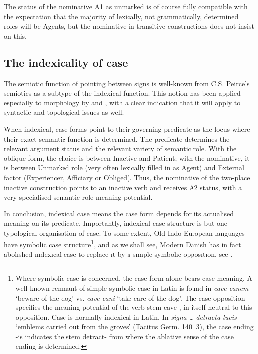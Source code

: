 \documentclass[output=paper]{langscibook}
\begin{document}
The status of the nominative A1 as unmarked is of course fully compatible with the expectation that the majority of lexically, not grammatically, determined roles will be Agents, but the nominative in transitive constructions does not insist on this. 

\subsection{The indexicality of case} \label{heltoft:3.1}

The semiotic function of pointing between signs is well-known from C.S. Peirce's semiotics as a subtype of the indexical function. This notion has been applied especially to morphology by \citet{Andersen1980} and \citet{Antilla1975}, with a clear indication that it will apply to syntactic and topological issues as well. 

When indexical, case forms point to their governing predicate as the locus where their exact semantic function is determined. The predicate determines the relevant argument status and the relevant variety of semantic role. With the oblique form, the choice is between Inactive and Patient; with the nominative, it is between Unmarked role (very often lexically filled in as Agent) and External factor (Experiencer, Afficiary or Obliged). Thus, the nominative of the two-place inactive construction points to an inactive verb and receives A2 status, with a very specialised semantic role meaning potential.  

In conclusion, indexical case means the case form depends for its actualised meaning on its predicate. Importantly, indexical case structure is but one typological organisation of case. To some extent, Old Indo-European languages have symbolic case structure\footnote{Where symbolic case is concerned, the case form alone bears case meaning. A well-known remnant of simple symbolic case in Latin is found in \textit{cave canem} ‘beware of the dog' vs. \textit{cave cani} ‘take care of the dog'. The case opposition specifies the meaning potential of the verb stem cave-, in itself neutral to this opposition. Case is normally indexical in Latin. In \textit{signa … detracta lucis} ‘emblems carried out from the groves' (Tacitus Germ. 140, 3), the case ending -is indicates the stem detract- from where the ablative sense of the case ending is determined.}, and as we shall see, Modern Danish has in fact abolished indexical case to replace it by a simple symbolic opposition, see .
\end{document}
